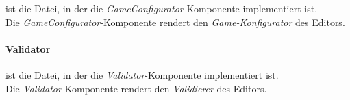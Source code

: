  ist die Datei, in der die \emph{GameConfigurator}-Komponente implementiert ist.\\

Die \emph{GameConfigurator}-Komponente rendert den \emph{Game-Konfigurator} des Editors.

\paragraph{Validator}

 ist die Datei, in der die \emph{Validator}-Komponente implementiert ist.\\

Die \emph{Validator}-Komponente rendert den \emph{Validierer} des Editors.
